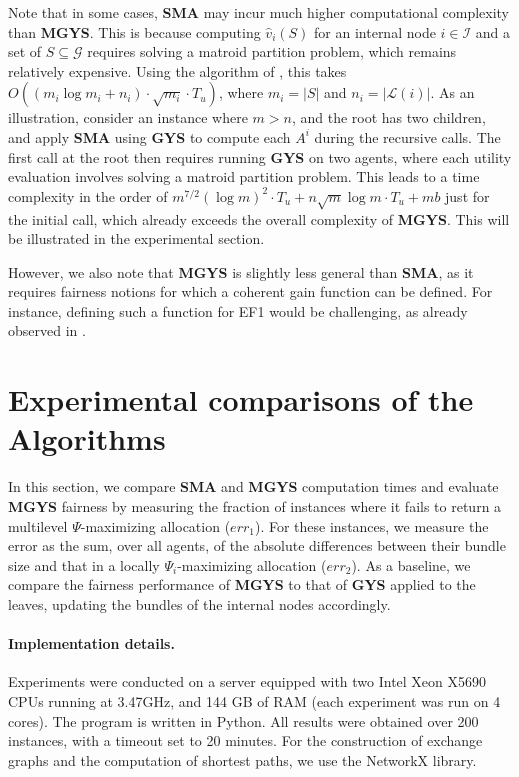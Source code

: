 \documentclass[]{article}
\newcommand{\items}{\mathcal{G}}
\newcommand{\leaves}{\mathcal{L}}
\newcommand{\internal}{\mathcal{I}}
\begin{document}
Note that in some cases, \textbf{SMA} may incur much higher computational complexity than \textbf{MGYS}. This is because computing $\hat{v}_i(S)$ for an internal node $i \in \internal$ and a set of $S \subseteq \items$ requires solving a matroid partition problem, which remains relatively expensive. Using the algorithm of \cite{Terao2025}, this takes $O((m_i \log m_i + n_i) \cdot \sqrt{m_i} \cdot T_u)$, where $m_i = |S|$ and $n_i = |\leaves(i)|$. As an illustration, consider an instance where $m > n$, and the root has two children, and apply {\bf SMA} using {\bf GYS} to compute each $A^i$ during the recursive calls. The first call at the root then requires running {\bf GYS} on two agents, where each utility evaluation involves solving a matroid partition problem. This leads to a time complexity in the order of $m^{7/2} (\log m)^2 \cdot T_u + n \sqrt{m}  \log m \cdot T_u + m b$ just for the initial call, which already exceeds the overall complexity of \textbf{MGYS}. This will be illustrated in the experimental section.

However, we also note that \textbf{MGYS} is slightly less general than \textbf{SMA}, as it requires fairness notions for which a coherent gain function can be defined. For instance, defining such a function for EF1 would be challenging, as already observed in \cite{Viswanathan_Zick2023b}.

\section{Experimental comparisons of the Algorithms} \label{section: simulations}

In this section, we compare {\bf SMA} and {\bf MGYS} computation times and evaluate {\bf MGYS} fairness by measuring the fraction of instances where it fails to return a multilevel $\Psi$-maximizing allocation ($err_1$). For these instances, we measure the error as the sum, over all agents, of the absolute differences between their bundle size and that in a locally $\Psi_i$-maximizing allocation ($err_2$). As a baseline, we compare the fairness performance of \textbf{MGYS} to that of \textbf{GYS} applied to the leaves, updating the bundles of the internal nodes accordingly.

\paragraph{Implementation details.} Experiments were conducted on a server equipped with two Intel Xeon X5690 CPUs running at 3.47GHz, and 144 GB of RAM (each experiment was run on 4 cores). The program is written in Python. All results were obtained over 200 instances, with a timeout set to 20 minutes. For the construction of exchange graphs and the computation of shortest paths, we use the NetworkX library. 
\end{document}
